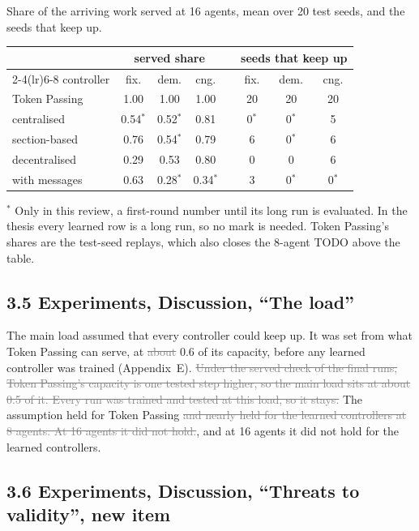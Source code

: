 \documentclass[11pt,a4paper]{article}
\newcommand{\new}[1]{\textcolor{newc}{#1}}
\newcommand{\old}[1]{\textcolor{gray}{\sout{#1}}}
\begin{document}
\begin{table}[H]\centering\small
\new{Share of the arriving work served at 16 agents, mean over 20
test seeds, and the seeds that keep up.}\par\smallskip
\begin{tabular}{l ccc c ccc}
\toprule
& \multicolumn{3}{c}{served share} && \multicolumn{3}{c}{seeds that keep up}\\
\cmidrule(lr){2-4}\cmidrule(lr){6-8}
controller & fix. & dem. & cng. && fix. & dem. & cng.\\
\midrule
Token Passing & 1.00 & 1.00 & 1.00 && 20 & 20 & 20\\
centralised & 0.54$^\ast$ & 0.52$^\ast$ & 0.81 && 0$^\ast$ & 0$^\ast$ & 5\\
section-based & 0.76 & 0.54$^\ast$ & 0.79 && 6 & 0$^\ast$ & 6\\
decentralised & 0.29 & 0.53 & 0.80 && 0 & 0 & 6\\
with messages & 0.63 & 0.28$^\ast$ & 0.34$^\ast$ && 3 & 0$^\ast$ & 0$^\ast$\\
\bottomrule
\end{tabular}
\end{table}

$^\ast$ Only in this review, a first-round number until its long run is
evaluated. In the thesis every learned row is a long run, so no mark is
needed. Token Passing's shares are the test-seed replays, which also closes
the 8-agent TODO above the table.

\subsection*{3.5 Experiments, Discussion, ``The load''}

The main load assumed that every controller could keep up. It was set from
what Token Passing can serve, at \old{about} 0.6 of its capacity, before
any learned controller was trained (Appendix~E). \old{Under the served
check of the final runs, Token Passing's capacity is one tested step
higher, so the main load sits at about 0.5 of it. Every run was trained and
tested at this load, so it stays.} The assumption held for Token Passing\old{
and nearly held for the learned controllers at 8 agents. At 16 agents it
did not hold.}\new{, and at 16 agents it did not hold for the learned
controllers.}

\subsection*{3.6 Experiments, Discussion, ``Threats to validity'', new item}
\end{document}
